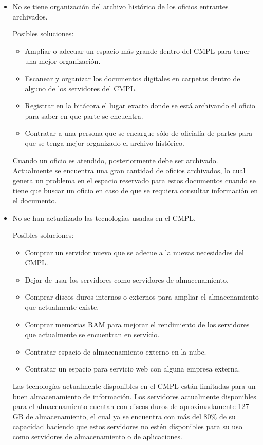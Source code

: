 \begin{itemize}
	\item No se tiene organización del archivo histórico de los oficios entrantes archivados.
	
	Posibles soluciones:
	\begin{itemize}
		\item Ampliar o adecuar un espacio más grande dentro del CMPL para tener una mejor organización.
		\item Escanear y organizar los documentos digitales en carpetas dentro de alguno de los servidores del CMPL.
		\item Registrar en la bitácora el lugar exacto donde se está archivando el oficio para saber en que parte se encuentra.
		\item Contratar a una persona que se encargue sólo de oficialía de partes para que se tenga mejor organizado el archivo histórico.
	\end{itemize}	
	
Cuando un oficio es atendido, posteriormente debe ser archivado. Actualmente se encuentra una gran cantidad de oficios archivados, lo cual genera un problema en el espacio reservado para estos documentos cuando se tiene que buscar un oficio en caso de que se requiera consultar información en el documento.
	
	\item No se han actualizado las tecnologías usadas en el CMPL.
	
	Posibles soluciones:
	\begin{itemize}
		\item Comprar un servidor nuevo que se adecue a la nuevas necesidades del CMPL.
		\item Dejar de usar los servidores como servidores de almacenamiento.
		\item Comprar discos duros internos o externos para ampliar el almacenamiento que actualmente existe.
		\item Comprar memorias RAM para mejorar el rendimiento de los servidores que actualmente se encuentran en servicio.	
		\item Contratar espacio de almacenamiento externo en la nube.
		\item Contratar un espacio para servicio web con alguna empresa externa.
	\end{itemize}	
	
Las tecnologías actualmente disponibles en el CMPL están limitadas para un buen almacenamiento de información. Los servidores actualmente disponibles  para el almacenamiento cuentan con discos duros de aproximadamente 127 GB de almacenamiento, el cual ya se encuentra con más del 80\% de su capacidad haciendo que estos servidores no estén disponibles para su uso como servidores de almacenamiento o de aplicaciones.


\end{itemize}
